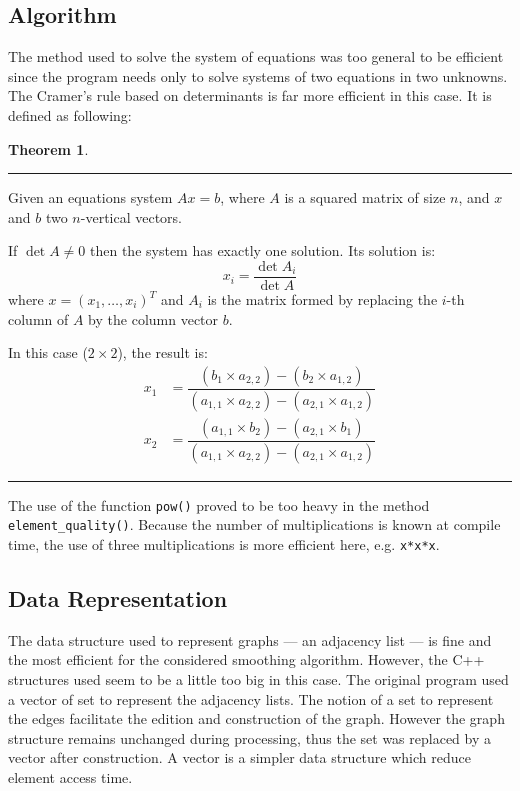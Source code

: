 \documentclass[fleqn,11pt]{SelfArx} %
\theoremstyle{definition}
\newtheorem{theorem}{Theorem}
\begin{document}
\subsection{Algorithm}

The method used to solve the system of equations was too general to be efficient since the program needs only to solve systems of two equations in two unknowns. The Cramer's rule based on determinants is far more efficient in this case. It is defined as following:

\begin{theorem}
\hrule \vspace*{1pt}
Given an equations system $Ax = b$, where $A$ is a squared matrix of size $n$, and $x$ and $b$ two $n$-vertical vectors.

If $\det A \neq 0$ then the system has exactly one solution. Its solution is:
\[x_i = \dfrac{\det A_i}{\det A}\]
where $x = (x_1,\dots,x_i)^T$ and $A_i$ is the matrix formed by replacing the $i$-th column of $A$  by the column vector $b$. 

In this case ($2\times2$), the result is:
\begin{align*}
x_1 &= \dfrac{(b_1 \times a_{2,2}) - (b_2 \times a_{1,2})}{(a_{1,1} \times a_{2,2}) - (a_{2,1} \times a_{1,2})} \\
x_2 &= \dfrac{(a_{1,1} \times b_2) - (a_{2,1} \times b_1)}{(a_{1,1} \times a_{2,2}) - (a_{2,1} \times a_{1,2})}
\end{align*}
\hrule
\end{theorem}

The use of the function \verb+pow()+ proved to be too heavy in the method \verb+element_quality()+. Because the number of multiplications is known at compile time, the use of three multiplications is more efficient here, e.g. \verb+x*x*x+.

\subsection{Data Representation}

The data structure used to represent graphs --- an adjacency list --- is fine and the most efficient for the considered smoothing algorithm. However, the C++ structures used seem to be a little too big in this case. The original program used a vector of set to represent the adjacency lists. The notion of a set to represent the edges facilitate the edition and construction of the graph. However the graph structure remains unchanged during processing, thus the set was replaced by a vector after construction. A vector is a simpler data structure which reduce element access time.
\end{document}
